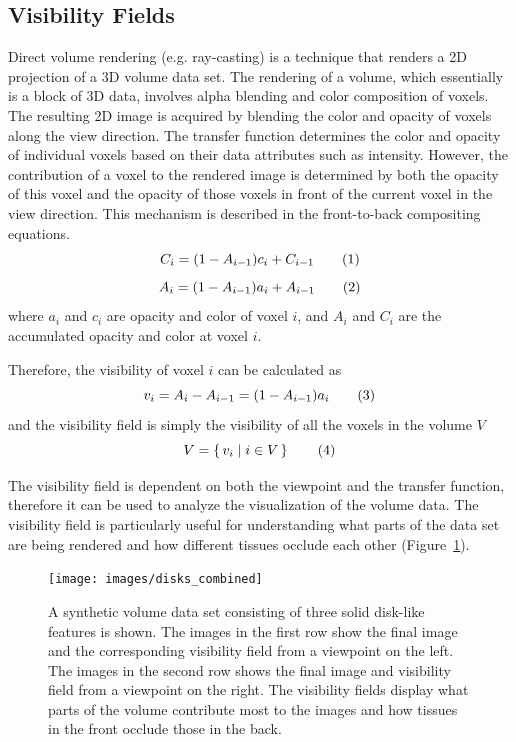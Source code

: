 
\subsection{Visibility Fields \label{visibility_fields}}
Direct volume rendering (e.g. ray-casting) is a technique that renders a 2D projection of a 3D volume data set. The rendering of a volume, which essentially is a block of 3D data, involves alpha blending and color composition of voxels. The resulting 2D image is acquired by blending the color and opacity of voxels along the view direction. The transfer function determines the color and opacity of individual voxels based on their data attributes such as intensity. However, the contribution of a voxel to the rendered image is determined by both the opacity of this voxel and the opacity of those voxels in front of the current voxel in the view direction.
This mechanism is described in the front-to-back compositing equations.
\[
C_{i}=(1-A_{i-1})c_{i}+C_{i-1}
\addtag \]
\[
A_{i}=(1-A_{i-1})a_{i}+A_{i-1}
\addtag \]
where $ a_{i} $ and $ c_{i} $ are opacity and color of voxel $ i $, and $A_{i}$ and $C_{i}$ are the accumulated opacity and color at  voxel $ i $.

Therefore, the visibility of voxel $ i $ \cite{emsenhuber_visibility_2008} can be calculated as
\[ v_{i}=A_{i}-A_{i-1}=(1-A_{i-1})a_{i} 
\addtag \]
and the visibility field is simply the visibility of all the voxels in the volume $ V $
\[ V=\set{v_{i}|i \in V} 
\addtag \]

The visibility field is dependent on both the viewpoint and the transfer function, therefore it can be used to analyze the visualization of the volume data. The visibility field is particularly useful for understanding what parts of the data set are being rendered and how different tissues occlude each other (Figure~\ref{fig:disks_combined}).

\begin{figure}
	\centering
	\texttt{[image: images/disks\_combined]}
	\caption[A synthetic volume data set consisting of three solid disk-like features]{A synthetic volume data set consisting of three solid disk-like features is shown. The images in the first row show the final image and the corresponding visibility field from a viewpoint on the left. The images in the second row shows the final image and visibility field from a viewpoint on the right. The visibility fields display what parts of the volume contribute most to the images and how tissues in the front occlude those in the back.}
	\label{fig:disks_combined}
\end{figure}

